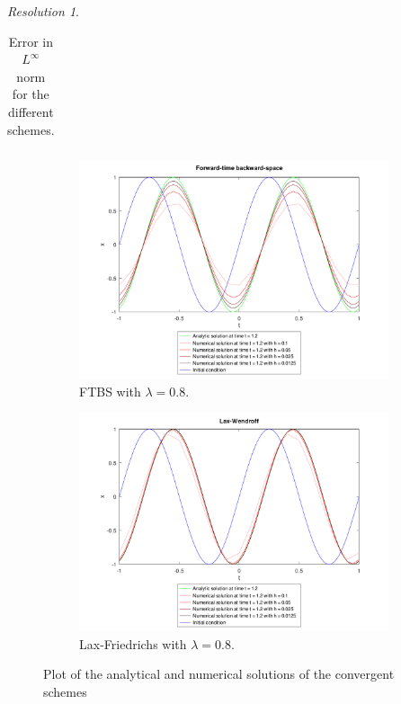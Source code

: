 \documentclass[10pt,a4paper]{article}
\theoremstyle{definition}
\theoremstyle{remark}
\newtheorem*{res}{Resolution}
\begin{document}
\begin{res}
\begin{table}[ht]
\begin{tabular}{|c|c|c|c|c||c|c|c|c|}
      \hline
    \end{tabular}
    \caption{Error in $L^\infty$ norm for the different schemes.}
  \end{table}
  \begin{figure}[ht]
    \centering
    \begin{subfigure}{0.49\textwidth}
      \centering
      \includegraphics[width=\textwidth]{Images/ex2-ftbs.pdf}
      \caption{FTBS with $\lambda=0.8$.}
    \end{subfigure}\hfill
    \begin{subfigure}{0.49\textwidth}
      \centering
      \includegraphics[width=\textwidth]{Images/ex2-lw.pdf}
      \caption{Lax-Friedrichs with $\lambda=0.8$.}
    \end{subfigure}
    \caption{Plot of the analytical and numerical solutions of the convergent schemes}
  \end{figure}
\end{res}
\end{document}

